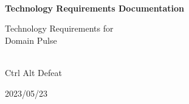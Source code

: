 \begin{titlepage}
    \centering


    
    \vspace{2cm}
    \hrulefill\\
    \vspace{1cm}
    {\Huge\bfseries Technology Requirements Documentation}
    
    \vspace{1cm}
    
    {\Large Technology Requirements for\\Domain Pulse}\\
    \vspace{1cm}
    \hrulefill\\
    
    \vfill
    
    {\large Ctrl Alt Defeat}
    
    \vspace{1cm}
    
    {\large 2023/05/23}\\

    
\end{titlepage}